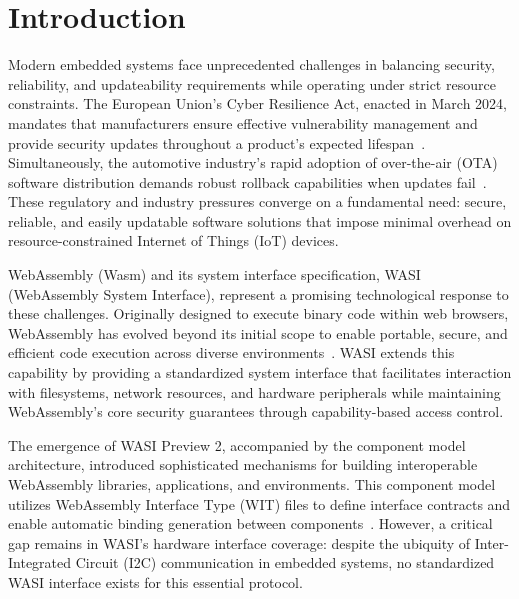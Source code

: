 \chapter{Introduction}
\label{chap:introduction}

Modern embedded systems face unprecedented challenges in balancing security, reliability, and updateability requirements while operating under strict resource constraints. The European Union's Cyber Resilience Act, enacted in March 2024, mandates that manufacturers ensure effective vulnerability management and provide security updates throughout a product's expected lifespan~\cite{eu_cyber_resilience_act}. Simultaneously, the automotive industry's rapid adoption of over-the-air (OTA) software distribution demands robust rollback capabilities when updates fail~\cite{automotive_ota}. These regulatory and industry pressures converge on a fundamental need: secure, reliable, and easily updatable software solutions that impose minimal overhead on resource-constrained Internet of Things (IoT) devices.

WebAssembly (Wasm) and its system interface specification, WASI (WebAssembly System Interface), represent a promising technological response to these challenges. Originally designed to execute binary code within web browsers, WebAssembly has evolved beyond its initial scope to enable portable, secure, and efficient code execution across diverse environments~\cite{wasm_spec}. WASI extends this capability by providing a standardized system interface that facilitates interaction with filesystems, network resources, and hardware peripherals while maintaining WebAssembly's core security guarantees through capability-based access control.


The emergence of WASI Preview 2, accompanied by the component model architecture, introduced sophisticated mechanisms for building interoperable WebAssembly libraries, applications, and environments. This component model utilizes WebAssembly Interface Type (WIT) files to define interface contracts and enable automatic binding generation between components~\cite{wasi_preview2}. However, a critical gap remains in WASI's hardware interface coverage: despite the ubiquity of Inter-Integrated Circuit (I2C) communication in embedded systems, no standardized WASI interface exists for this essential protocol.

